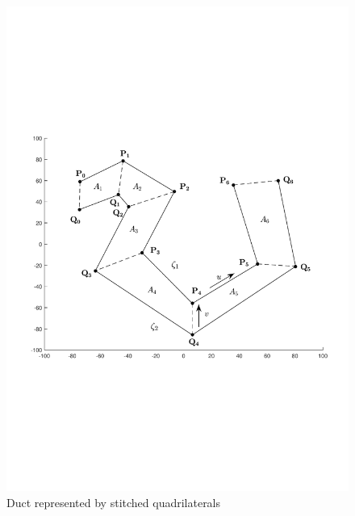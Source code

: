 \documentclass[11pt,a4paper]{article}
\begin{document}
\begin{figure}[h]
\centering
\includegraphics[scale=0.5]{figures/fig7.pdf}
\caption{Duct represented by stitched quadrilaterals\label{fig:stitchequads}}
\end{figure}
\end{document}
